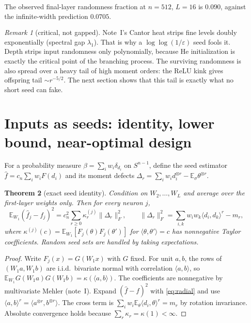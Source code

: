 \documentclass[11pt]{article}
\newtheorem{theorem}{Theorem}[section]
\theoremstyle{definition}
\theoremstyle{remark}
\newtheorem{remark}[theorem]{Remark}
\newcommand{\E}{\mathbb E}
\begin{document}
\noindent The observed final-layer randomness fraction at $n=512$, $L=16$ is $0.090$, against the infinite-width prediction $0.0705$.

\begin{remark}[critical, not gapped]
Note~I's Cantor heat strips fine levels doubly exponentially (spectral gap $\lambda_1$). That is why a $\log\log(1/\varepsilon)$ seed fools it. Depth strips input randomness only polynomially, because He initialization is exactly the critical point of the branching process. The surviving randomness is also spread over a heavy tail of high moment orders: the ReLU kink gives offspring tail $\sim r^{-5/2}$. The next section shows that this tail is exactly what no short seed can fake.
\end{remark}

\section{Inputs as seeds: identity, lower bound, near-optimal design}\label{sec:seeds}

For a probability measure $\beta=\sum_iw_i\delta_{d_i}$ on $S^{n-1}$, define the seed estimator $\hat f=c_n\sum_iw_iF(d_i)$ and its moment defects $\Delta_r=\sum_iw_id_i^{\otimes r}-\E_\sigma\theta^{\otimes r}$.

\begin{theorem}[exact seed identity]\label{thm:seed}
Condition on $W_2,\dots,W_L$ and average over the first-layer weights only. Then for every neuron $j$,
\[\E_{W_1}(\hat f_j-f_j)^2=c_n^2\sum_{r\ge0}\kappa^{(j)}_r\|\Delta_r\|_F^2,\qquad \|\Delta_r\|_F^2=\sum_{i,k}w_iw_k\langle d_i,d_k\rangle^r-m_r,\]
where $\kappa^{(j)}(c)=\E_{W_1}[F_j(\theta)F_j(\theta')]$ for $\langle\theta,\theta'\rangle=c$ has nonnegative Taylor coefficients. Random seed sets are handled by taking expectations.
\end{theorem}

\begin{proof}
Write $F_j(x)=G(W_1x)$ with $G$ fixed. For unit $a,b$, the rows of $(W_1a,W_1b)$ are i.i.d.\ bivariate normal with correlation $\langle a,b\rangle$, so $\E_{W_1}G(W_1a)G(W_1b)=\kappa(\langle a,b\rangle)$. The coefficients are nonnegative by multivariate Mehler (note~I). Expand $(\hat f-f)^2$ with \eqref{eq:radial} and use $\langle a,b\rangle^r=\langle a^{\otimes r},b^{\otimes r}\rangle$. The cross term is $\sum_iw_i\E_\theta\langle d_i,\theta\rangle^r=m_r$ by rotation invariance. Absolute convergence holds because $\sum_r\kappa_r=\kappa(1)<\infty$.
\end{proof}
\end{document}
